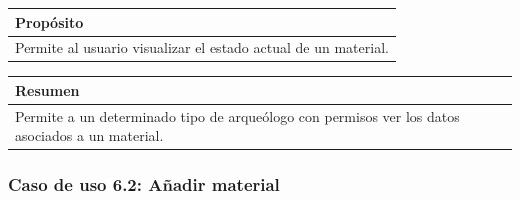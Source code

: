     \begin{table}[H]
        \centering
        \begin{tabularx}{\textwidth}{@{} |L |@{}} \hline
            \textbf{Propósito} \\
            \hline
            Permite al usuario visualizar el estado actual de un material. \\
            \hline
        \end{tabularx}
    \end{table}

    \begin{table}[H]
        \centering
        \begin{tabularx}{\textwidth}{@{} |L |@{}} \hline
            \textbf{Resumen} \\
            \hline
            Permite a un determinado tipo de arqueólogo con permisos ver los datos asociados
            a un material. \\
            \hline
        \end{tabularx}
    \end{table}

\subsubsection{Caso de uso 6.2: Añadir material}

